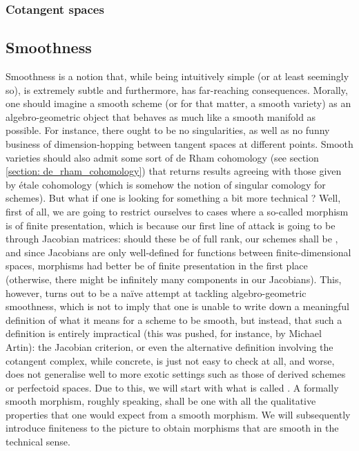                     
            \subsubsection{Cotangent spaces} \label{subsubsection: cotangent_spaces}
    
        \subsection{Smoothness}
            Smoothness is a notion that, while being intuitively simple (or at least seemingly so), is extremely subtle and furthermore, has far-reaching consequences. Morally, one should imagine a smooth scheme (or for that matter, a smooth variety) as an algebro-geometric object that behaves as much like a smooth manifold as possible. For instance, there ought to be no singularities, as well as no funny business of dimension-hopping between tangent spaces at different points. Smooth varieties should also admit some sort of de Rham cohomology (see section \ref{section: de_rham_cohomology}) that returns results agreeing with those given by \'etale cohomology (which is somehow the  notion of singular comology for schemes). But what if one is looking for something a bit more technical ? Well, first of all, we are going to restrict ourselves to cases where a so-called  morphism is of finite presentation, which is because our first line of attack is going to be through Jacobian matrices: should these be of full rank, our schemes shall be , and since Jacobians are only well-defined for functions between finite-dimensional spaces,  morphisms had better be of finite presentation in the first place (otherwise, there might be infinitely many components in our Jacobians). This, however, turns out to be a na\"ive attempt at tackling algebro-geometric smoothness, which is not to imply that one is unable to write down a meaningful definition of what it means for a scheme to be smooth, but instead, that such a definition is entirely impractical (this was pushed, for instance, by Michael Artin): the Jacobian criterion, or even the alternative definition involving the cotangent complex, while concrete, is just not easy to check at all, and worse, does not generalise well to more exotic settings such as those of derived schemes or perfectoid spaces. Due to this, we will start with what is called . A formally smooth morphism, roughly speaking, shall be one with all the qualitative properties that one would expect from a smooth morphism. We will subsequently introduce finiteness to the picture to obtain morphisms that are smooth in the technical sense. 
        
